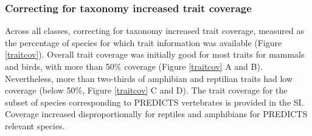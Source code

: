 \subsubsection{Correcting for taxonomy increased trait coverage}
Across all classes, correcting for taxonomy increased trait coverage, measured as the percentage of species for which trait information was available (Figure \ref{traitcov}). Overall trait coverage was initially good for most traits for mammals and birds, with more than 50\% coverage (Figure \ref{traitcov} A and B). Nevertheless, more than two-thirds of amphibian and reptilian traits had low coverage (below 50\%, Figure \ref{traitcov} C and D). 
The trait coverage for the subset of species corresponding to PREDICTS vertebrates is provided in the SI. Coverage increased disproportionally for reptiles and amphibians for PREDICTS relevant species.

